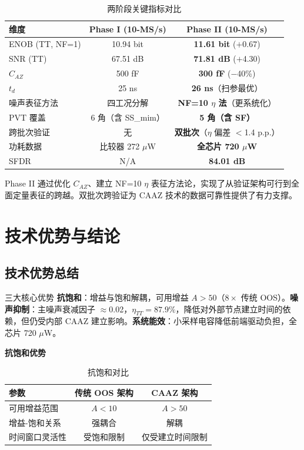 \documentclass[11pt,a4paper,UTF8]{ctexart}
\begin{document}
\begin{table}[htbp]\centering\caption{两阶段关键指标对比}\label{tab:evolution2}\small
\begin{tabular}{lcc}\toprule
\textbf{维度} & \textbf{Phase I (10-MS/s)} & \textbf{Phase II (10-MS/s)} \\\midrule
ENOB (TT, NF=1) & 10.94 bit & \textbf{11.61 bit} ($+$0.67) \\
SNR (TT) & 67.51 dB & \textbf{71.81 dB} ($+$4.30) \\
$C_{AZ}$ & 500 fF & \textbf{300 fF} ($-$40\%) \\
$t_d$ & 25 ns & \textbf{26 ns}（扫参最优） \\
噪声表征方法 & 四工况分解 & \textbf{NF=10 $\eta$ 法}（更系统化） \\
PVT 覆盖 & 6 角（含 SS\_mim） & \textbf{5 角（含 SF）} \\
跨批次验证 & 无 & \textbf{双批次}（$\eta$ 偏差 $<$1.4 p.p.） \\
功耗数据 & 比较器 272 $\mu$W & \textbf{全芯片 720 $\mu$W} \\
SFDR & N/A & \textbf{84.01 dB} \\\bottomrule
\end{tabular}
\end{table}

Phase II 通过优化 $C_{AZ}$、建立 NF=10 $\eta$ 表征方法论，实现了从验证架构可行到全面定量表征的跨越。双批次跨验证为 CAAZ 技术的数据可靠性提供了有力支撑。

\section{技术优势与结论}
\label{sec:conclusion}

\subsection{技术优势总结}

\begin{findbox}{三大核心优势}
\textbf{抗饱和}：增益与饱和解耦，可用增益 $A > 50$（$8\times$ 传统 OOS）。\textbf{噪声抑制}：主噪声衰减因子 $\approx$0.02，$\eta_{TT}=87.9\%$，降低对外部节点建立时间的依赖，但仍受内部 CAAZ 建立影响。\textbf{系统能效}：小采样电容降低前端驱动负担，全芯片 720 $\mu$W。
\end{findbox}

\textbf{抗饱和优势}

\begin{table}[htbp]\centering\caption{抗饱和对比}\label{tab:anti-sat}\small
\begin{tabular}{lcc}\toprule
\textbf{参数} & \textbf{传统 OOS 架构} & \textbf{CAAZ 架构} \\\midrule
可用增益范围 & $A < 10$ & $A > 50$ \\
增益-饱和关系 & 强耦合 & 解耦 \\
时间窗口灵活性 & 受饱和限制 & 仅受建立时间限制 \\\bottomrule
\end{tabular}
\end{table}
\end{document}
